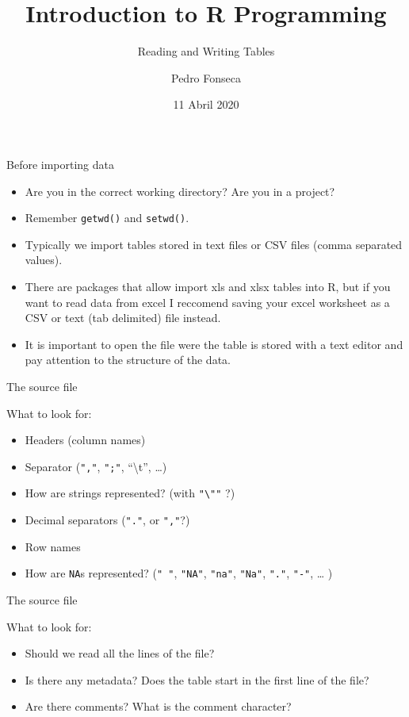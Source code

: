 \documentclass[ignorenonframetext,]{beamer}
\title{Introduction to R Programming}
\subtitle{Reading and Writing Tables}
\author{Pedro Fonseca}
\date{11 Abril 2020}
\begin{document}
\frame{\titlepage}

\begin{frame}[fragile]{Before importing data}
\protect\hypertarget{before-importing-data}{}

\begin{itemize}
\item
  Are you in the correct working directory? Are you in a project?
\item
  Remember \texttt{getwd()} and \texttt{setwd()}.
\item
  Typically we import tables stored in text files or CSV files (comma
  separated values).
\item
  There are packages that allow import xls and xlsx tables into R, but
  if you want to read data from excel I reccomend saving your excel
  worksheet as a CSV or text (tab delimited) file instead.
\item
  It is important to open the file were the table is stored with a text
  editor and pay attention to the structure of the data.
\end{itemize}

\end{frame}

\begin{frame}[fragile]{The source file}
\protect\hypertarget{the-source-file}{}

What to look for:

\begin{itemize}
\item
  Headers (column names)
\item
  Separator (\texttt{","}, \texttt{";"}, ``\textbackslash{}t'',
  \ldots{})
\item
  How are strings represented? (with \texttt{"\textbackslash{}""} ?)
\item
  Decimal separators (\texttt{"."}, or \texttt{","}?)
\item
  Row names
\item
  How are \texttt{NA}s represented? (\texttt{"\ "}, \texttt{"NA"},
  \texttt{"na"}, \texttt{"Na"}, \texttt{"."}, \texttt{"-"}, \ldots{} )
\end{itemize}

\end{frame}

\begin{frame}{The source file}
\protect\hypertarget{the-source-file-1}{}

What to look for:

\begin{itemize}
\item
  Should we read all the lines of the file?
\item
  Is there any metadata? Does the table start in the first line of the
  file?
\item
  Are there comments? What is the comment character?
\end{itemize}

\end{frame}
\end{document}
